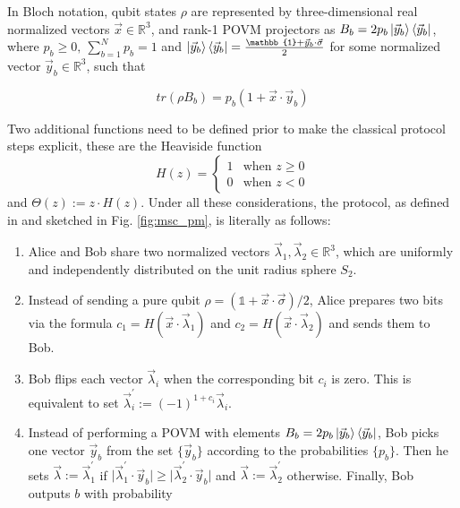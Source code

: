 In Bloch notation, qubit states $\rho$ are represented by three-dimensional real normalized vectors $\vec{x} \in \mathbb{R}^{3}$, and rank-1 POVM projectors as $B_b = 2p_b\ket{\vec{y}_b}\bra{\vec{y}_b}$, where $p_b\ge0,\ \sum_{b=1}^{N}p_b=1$ and $\ket{\vec{y}_b}\bra{\vec{y}_b} = \frac{\mathbb{1} + \vec{y}_b \cdot \vec{\sigma}}{2}$ for some normalized vector $\vec{y}_b \in \mathbb{R}^{3}$, such that

\begin{equation}
tr(\rho B_b) = p_b(1 + \vec{x} \cdot \vec{y}_b) 
\end{equation}

Two additional functions need to be defined prior to make the classical protocol steps explicit, these are the Heaviside function
\begin{equation}
H(z) =
    \begin{cases}
      1 & \text{when $z \ge 0$}\\
      0 & \text{when $z<0$}
    \end{cases} 
\end{equation}
and $\Theta(z) := z \cdot H(z)$. Under all these considerations, the protocol, as defined in \cite{renner2022} and sketched in Fig. \ref{fig:msc_pm}, is literally as follows:
\begin{enumerate}
 \item Alice and Bob share two normalized vectors $\vec{\lambda}_1, \vec{\lambda}_2 \in \mathbb{R}^{3}$, which are uniformly and independently distributed on the unit radius sphere $S_2$.
 \item Instead of sending a pure qubit $\rho = (\mathbb{1} + \vec{x} \cdot \vec{\sigma})/2$, Alice prepares two bits via the formula $c_1= H(\vec{x} \cdot \vec{\lambda}_1)$ and $c_2= H(\vec{x} \cdot \vec{\lambda}_2)$ and sends them to Bob.
 \item Bob flips each vector $\vec{\lambda}_i$ when the corresponding bit $c_i$ is zero. This is equivalent to set $\vec{\lambda}^{\prime}_{i} := (-1)^{1 + c_i} \vec{\lambda}_{i}$.
 \item Instead of performing a POVM with elements $B_b = 2p_b\ket{\vec{y}_b}\bra{\vec{y}_b}$, Bob picks one vector $\vec{y}_b$ from the set $\{\vec{y}_b\}$ according to the probabilities $\{p_b\}$. Then he sets $\vec{\lambda} := \vec{\lambda}^{\prime}_1$ if $\lvert \vec{\lambda}^{\prime}_1 \cdot \vec{y}_b \rvert \ge \lvert \vec{\lambda}^{\prime}_2 \cdot \vec{y}_b \rvert$ and $\vec{\lambda} := \vec{\lambda}^{\prime}_2$ otherwise. Finally, Bob outputs $b$ with probability
\end{enumerate}

